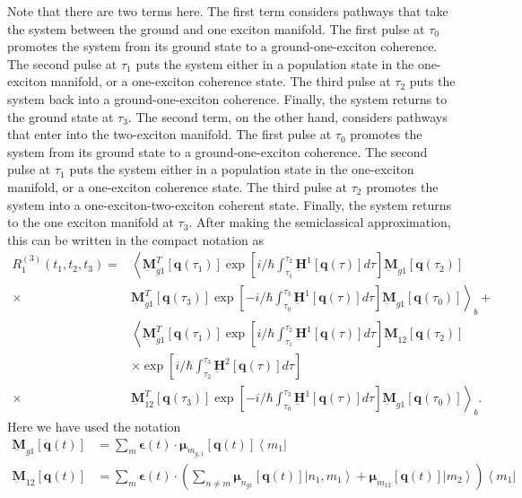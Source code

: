 \documentclass{article}
\newcommand{\bra}[1]{\ensuremath{\left\langle#1\right|}}
\newcommand{\ket}[1]{\ensuremath{\left|#1\right\rangle}}
\newcommand{\vect}[1]{\ensuremath{\boldsymbol{\mathbf{#1}}}}
\begin{document}
Note that there are two terms here.
The first term considers pathways that take the system between the ground and one exciton manifold.
The first pulse at $\tau_{0}$ promotes the system from its ground state to a ground-one-exciton coherence.
The second pulse at $\tau_{1}$ puts the system either in a population state in the one-exciton manifold, or a one-exciton coherence state.
The third pulse at $\tau_{2}$ puts the system back into a ground-one-exciton coherence.
Finally, the system returns to the ground state at $\tau_{3}$.
The second term, on the other hand, considers pathways that enter into the two-exciton manifold.
The first pulse at $\tau_{0}$ promotes the system from its ground state to a ground-one-exciton coherence.
The second pulse at $\tau_{1}$ puts the system either in a population state in the one-exciton manifold, or a one-exciton coherence state.
The third pulse at $\tau_{2}$ promotes the system into a one-exciton-two-exciton coherent state.
Finally, the system returns to the one exciton manifold at $\tau_{3}$.
After making the semiclassical approximation, this can be written in the compact notation as
\begin{equation}
\begin{split}
 R_{1}^{(3)}(t_{1},t_{2},t_{3})=&\left\langle\underbar{\vect{M}}_{g1}^{T}[\vect q(\tau_{1})]\exp\left[i/\hbar\int_{\tau_{1}}^{\tau_{2}}\underbar{\vect{H}}^{1}[\vect q(\tau)]d\tau\right] \underbar{\vect{M}}_{g1} [\vect q(\tau_{2})]\right.\\
			  \times&\left.\underbar{\vect{M}}_{g1}^{T}[\vect q(\tau_{3})]\exp\left[-i/\hbar\int_{\tau_{0}}^{\tau_{3}}\underbar{\vect{H}}^{1}[\vect q(\tau)]d\tau\right] \underbar{\vect{M}}_{g1} [\vect q(\tau_{0})]\right\rangle_{b}+\\
			  &\left\langle\underbar{\vect{M}}_{g1}^{T}[\vect q(\tau_{1})]\exp\left[i/\hbar\int_{\tau_{1}}^{\tau_{2}}\underbar{\vect{H}}^{1}[\vect q(\tau)]d\tau\right] \underbar{\vect{M}}_{12} [\vect q(\tau_{2})]\right.\\
			  &\times\exp\left[i/\hbar\int_{\tau_{2}}^{\tau_{3}}\underbar{\vect{H}}^{2}[\vect q(\tau)]d\tau\right]\\
			  \times&\left.\underbar{\vect{M}}_{12}^{T}[\vect q(\tau_{3})]\exp\left[-i/\hbar\int_{\tau_{0}}^{\tau_{3}}\underbar{\vect{H}}^{1}[\vect q(\tau)]d\tau\right] \underbar{\vect{M}}_{g1} [\vect q(\tau_{0})]\right\rangle_{b}.
\end{split}
\end{equation}
Here we have used the notation
\begin{equation}
\begin{split}
\underbar{\vect{M}}_{g1}[\vect q(t)]&=\sum_{m}\vect\epsilon(t)\cdot \vect\mu_{m_{g,1}}[\vect q(t)] \bra{m_{1}}\\
\underbar{\vect{M}}_{12}[\vect q(t)]&=\sum_{m}\vect\epsilon(t)\cdot\left( \sum_{n\ne m}\vect\mu_{n_{g1}}[\vect q(t)]\ket{n_{1},m_{1}}+\vect\mu_{m_{12}}[\vect q(t)]\ket{m_{2}} \right)\bra{m_{1}}
\end{split}
\end{equation}
\end{document}
